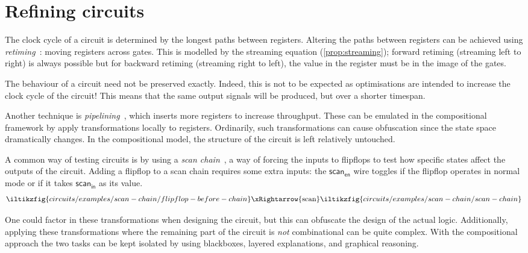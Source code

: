 \section{Refining circuits}


\begin{example}[Retiming]
    The clock cycle of a circuit is determined by the longest paths between
    registers. Altering the paths between registers can be achieved using
    \emph{retiming}~\cite{leiserson1991retiming}: moving registers across gates.
    This is modelled by the streaming equation (\cref{prop:streaming});
    forward retiming (streaming left to right) is always possible
    but for backward retiming (streaming right to left), the value
    in the register must be in the image of the gates.
\end{example}

The behaviour of a circuit need not be preserved exactly.
Indeed, this is not to be expected as optimisations are intended to increase the
clock cycle of the circuit!
This means that the same output signals will be produced, but over a shorter
timespan.

\begin{example}[Pipelining]
    Another technique is \emph{pipelining}~\cite{parhi1999vlsi}, which inserts
    more registers to increase throughput.
    These can be emulated in the compositional framework by apply
    transformations locally to registers.
    Ordinarily, such transformations can cause obfuscation since the state space
    dramatically changes. In the compositional model, the structure of the
    circuit is left relatively untouched.
\end{example}

\begin{example}
    A common way of testing circuits is by using a
    \emph{scan chain}~\cite{mourad2000principles}, a way of forcing the
    inputs to flipflops to test how specific states affect the outputs of the
    circuit.
    Adding a flipflop to a scan chain requires some extra inputs: the
    \(\mathsf{scan}_\mathsf{en}\) wire toggles if the flipflop operates in
    normal mode or if it takes \(\mathsf{scan}_\mathsf{in}\) as its value.
    \[
        \iltikzfig{circuits/examples/scan-chain/flipflop-before-chain}
        \xRightarrow{\text{scan}}
        \iltikzfig{circuits/examples/scan-chain/scan-chain}
    \]
\end{example}

One could factor in these transformations when designing the circuit, but this
can obfuscate the design of the actual logic.
Additionally, applying these transformations where the remaining part of the
circuit is \emph{not} combinational can be quite complex.
With the compositional approach the two tasks can be kept isolated by using
blackboxes, layered explanations, and graphical reasoning.